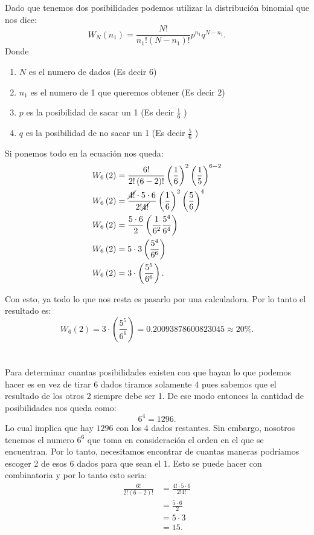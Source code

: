 \documentclass{report}
\begin{document}
\section{}

Dado que tenemos dos posibilidades podemos utilizar la distribución binomial que nos dice: \[
W_N\left( n_1 \right) = \frac{N!}{n_1!\left( N-n_1 \right)!}p^{n_1}q^{N - n_1}
.\] Donde
\begin{enumerate}
  \item $N$ es el numero de dados (Es decir $6$)
  \item $n_1$ es el numero de 1 que queremos obtener (Es decir $2$)
  \item $p$ es la posibilidad de sacar un 1 (Es decir $\frac{1}{6}$ )
  \item $q$ es la posibilidad de no sacar un 1 (Es decir  $\frac{5}{6}$ )
\end{enumerate}

Si ponemos todo en la ecuación nos queda:
\begin{align*}
  W_6\left( 2 \right) &= \frac{6!}{2!\left( 6 - 2 \right)!}\left( \frac{1}{6} \right) ^{2} \left( \frac{1}{5} \right) ^{6-2} \\
  W_6\left( 2 \right) &= \frac{\cancel{4!}\cdot 5 \cdot 6}{2!\cancel{4!}}\left( \frac{1}{6} \right) ^{2}\left( \frac{5}{6} \right) ^{4} \\
  W_6\left( 2 \right) &= \frac{5 \cdot 6}{2}\left( \frac{1}{6^2} \frac{5^{4}}{6^{4}}\right)  \\
  W_6\left( 2 \right) &= 5 \cdot 3 \left( \frac{5^{4}}{6^{6}} \right)  \\
  W_6\left( 2 \right) &= 3 \cdot \left( \frac{5^{5}}{6^{6}} \right)
.\end{align*}

Con esto, ya todo lo que nos resta es pasarlo por una calculadora. Por lo tanto el resultado es: \[
W_6\left( 2 \right) = 3 \cdot \left( \frac{5^{5}}{6^{6}} \right) = 0.20093878600823045 \approx 20\%
.\] 

\section{}

Para determinar cuantas posibilidades existen con que hayan lo que podemos hacer es en vez de tirar 6 dados tiramos solamente 4 pues sabemos que el resultado de los otros 2 siempre debe ser 1. De ese modo entonces la cantidad de posibilidades nos queda como: \[
6^{4} = 1296
.\] Lo cual implica que hay $1296$ con los 4 dados restantes. Sin embargo, nosotros tenemos el numero $6^{6}$ que toma en consideración el orden en el que se encuentran. Por lo tanto, necesitamos encontrar de cuantas maneras podríamos escoger 2 de esos 6 dados para que sean el 1. Esto se puede hacer con combinatoria y por lo tanto esto seria:
\begin{align*}
  \frac{6!}{2!\left( 6-2 \right)!} &= \frac{4! \cdot  5 \cdot 6}{2! 4!} \\
  &= \frac{5 \cdot 6}{2} \\
  &= 5\cdot 3 \\
  &= 15
.\end{align*}
\end{document}
